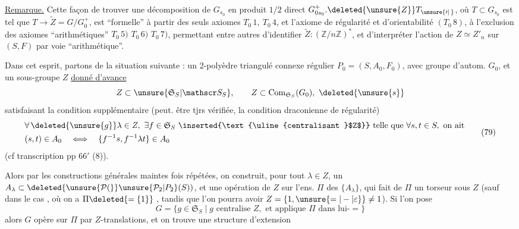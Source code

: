 \uline{Remarque.} Cette façon de trouver une décomposition de $G_{s_0}$ en produit $1/2$ direct $G^+_{0s_0}.\deleted{\unsure{Z}}T_{\unsure{\prime|\,}}$, où $T\subset G_{s_0}$ est tel que $T\longrightarrow\widetilde Z=G/G_0^+$, est ``formelle'' à partir des seuls axiomes $T_0\,1,\ T_0\,4$, et l'axiome de régularité et d'orientabilité $(T_0\,8)$,
à l'exclusion des axiomes ``arithmétiques'' $T_0\,5)$ $T_0\,6)$ $T_0\,7)$, permettant entre autres d'identifier $\widetilde Z:(\mathbb Z/n\mathbb Z)^*$, et d'interpréter l'action de $Z\simeq Z'_n$ sur $(S,F)$ par voie ``arithmétique''.

Dans cet esprit, partons de la situation suivante : un 2-polyèdre triangulé connexe régulier $P_0=(S,A_0,F_0)$, avec groupe d'autom. $G_0$, et un sous-groupe $Z$ \uline{donné d'avance}
\[
Z\subset\unsure{\mathfrak S_S|\mathscr S_S},\qquad Z\subset\mathrm{Com}_{\mathfrak S_S}(G_0),\ \deleted{\unsure{s}}
\]
satisfaisant la condition supplémentaire (peut. être tjrs vérifiée,  la condition draconienne de régularité)
\[
\begin{aligned}
&\forall\,\deleted{\unsure{g}}\lambda\in Z,\ \exists f\in\mathfrak S_S\ \inserted{\text{\uline{centralisant }$Z$}}\ \text{telle que }\forall s,t\in S,\ \text{on ait}\\
&(s,t)\in A_0\quad\Longleftrightarrow\quad\{f^{-1}s,f^{-1}\lambda t\}\in A_0
\end{aligned}\tag*{(79)}
\]
(cf transcription pp 66$'$ (8)).

Alors par les constructions générales maintes fois répétées, on construit, pour tout $\lambda\in Z$, un $A_\lambda\subset\deleted{\unsure{\mathcal P(}}\unsure{\mathcal P_2|P_2}(S))$, et une opération  de $Z$ sur l'ens. $\Pi$  des $\{A_\lambda\}$,  qui fait de $\Pi$ un torseur sous $Z$ (sauf dans le cas , où on a $\Pi\deleted{=\{1\}}$ , tandis que l'on pourra avoir $Z=\{1,\unsure{=|-|\varepsilon}\}\ne1$).
Si l'on pose
\[
G=\{g\in\mathfrak S_S\mid g\text{ centralise }Z,\text{ et applique }\Pi\text{ dans lui-}=\}
\tag*{(80)}
\]
alors $G$ opère sur $\Pi$ par $Z$-translations, et on
trouve une structure d'extension

